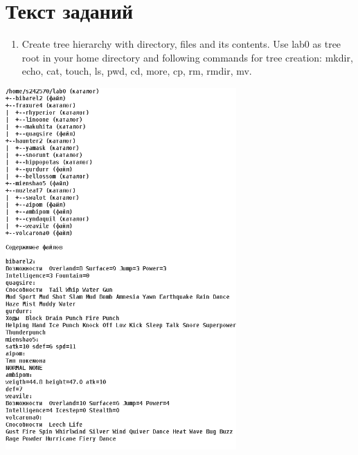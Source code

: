 \documentclass[11pt]{article}
\begin{document}
\section{Текст заданий}
\label{sec:orge8ed9bb}
\begin{enumerate}
\item Create tree hierarchy with directory, files and its contents. Use lab0 as tree root in your home directory and following commands for tree creation: mkdir, echo, cat, touch, ls, pwd, cd, more, cp, rm, rmdir, mv.
\end{enumerate}
\includegraphics[width=250pt]{./1.png}
\small
\end{document}
